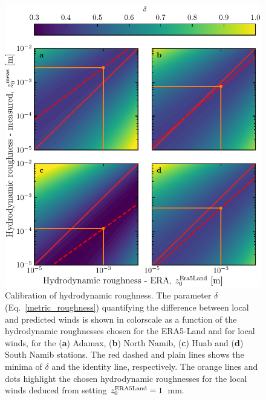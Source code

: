 \begin{figure}[p]
\centering
\includegraphics[scale=1]{Figures/Figure3_supp.pdf}
\caption{Calibration of hydrodynamic roughness. The parameter $\delta$ (Eq.~\ref{metric_roughness}) quantifying the difference between local and predicted winds is shown in colorscale as a function of the hydrodynamic roughnesses chosen for the ERA5-Land and for local winds, for the (\textbf{a}) Adamax, (\textbf{b}) North Namib, (\textbf{c}) Huab and (\textbf{d}) South Namib stations. The red dashed and plain lines shows the minima of $\delta$ and the identity line, respectively. The orange lines and dots highlight the chosen hydrodynamic roughnesses for the local winds deduced from setting $z_{0}^{\textup{ERA5Land}} = 1$~mm.}
\label{Fig3_supp}
\end{figure}

